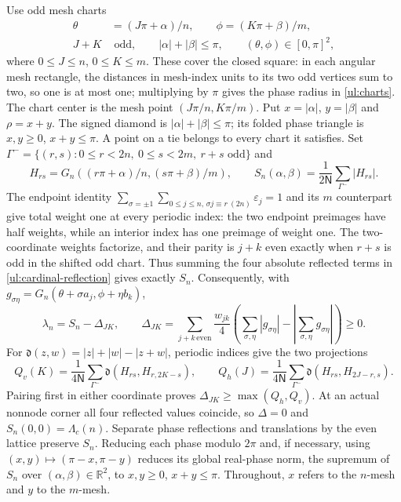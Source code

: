 Use odd mesh charts
\begin{equation}\label{ul:charts}
 \begin{aligned}
 \theta&=(J\pi+\alpha)/n,\qquad \phi=(K\pi+\beta)/m,\\
 J+K&\text{ odd},\qquad |\alpha|+|\beta|\leq\pi,
       \qquad (\theta,\phi)\in[0,\pi]^2,
 \end{aligned}
\end{equation}
where $0\leq J\leq n$, $0\leq K\leq m$.  These cover the closed
square: in each angular mesh rectangle, the distances in mesh-index units to its
two odd vertices sum to two, so one is at most one; multiplying by
$\pi$ gives the phase radius in \eqref{ul:charts}.  The chart center is the mesh point $(J\pi/n,K\pi/m)$. Put
$x=|\alpha|$, $y=|\beta|$ and $\rho=x+y$.
The signed diamond is $|\alpha|+|\beta|\leq\pi$; its folded
phase triangle is $x,y\geq0$, $x+y\leq\pi$.
A point on a tie belongs to every chart it satisfies.
Set $\Gamma^-=\{(r,s):0\leq r<2n,\ 0\leq s<2m,\ r+s\text{ odd}\}$ and
\begin{equation}\label{ul:primitive}
 H_{rs}=G_n((r\pi+\alpha)/n,(s\pi+\beta)/m),\qquad
 S_n(\alpha,\beta)=\frac1{2\mathsf N}\sum_{\Gamma^-}|H_{rs}|.
\end{equation}
The endpoint identity
$\sum_{\sigma=\pm1}\sum_{0\leq j\leq n,\,\sigma j\equiv r\ (2n )}\varepsilon_j=1$
and its $m$ counterpart give total weight one at every periodic
index: the two endpoint preimages have half weights, while an interior
index has one preimage of weight one. The two-coordinate weights
factorize, and their parity is $j+k$ even exactly when $r+s$ is odd
in the shifted odd chart. Thus summing the four absolute reflected
terms in \eqref{ul:cardinal-reflection} gives exactly $S_n$.
Consequently, with $g_{\sigma\eta}=G_n(\theta+\sigma a_j,\phi+\eta b_k)$,
\begin{equation}\label{ul:defect}
 \lambda_n=S_n-\Delta_{JK},\qquad
 \Delta_{JK}=\sum_{j+k\,\mathrm{even}}\frac{w_{jk}}4
 \left(\sum_{\sigma,\eta}|g_{\sigma\eta}|
             -\left|\sum_{\sigma,\eta}g_{\sigma\eta}\right|\right)\geq0.
\end{equation}
For $\mathfrak d(z,w)=|z|+|w|-|z+w|$, periodic indices give the two projections
\begin{equation}\label{ul:projections}
 Q_v(K)=\frac1{4\mathsf N}\sum_{\Gamma^-}\mathfrak d(H_{rs},H_{r,2K-s}),
 \qquad
 Q_h(J)=\frac1{4\mathsf N}\sum_{\Gamma^-}\mathfrak d(H_{rs},H_{2J-r,s}).
\end{equation}
Pairing first in either coordinate proves
$\Delta_{JK}\geq\max(Q_h,Q_v)$.
At an actual nonnode corner all four reflected values coincide, so
$\Delta=0$ and $S_n(0,0)=\Lambda_c(n)$.
Separate phase reflections and translations by the even lattice preserve
$S_n$.  Reducing each phase modulo $2\pi$ and, if necessary, using
$(x,y)\mapsto(\pi-x,\pi-y)$ reduces its global real-phase norm, the supremum of $S_n$ over
$(\alpha,\beta)\in\mathbb R^2$, to
$x,y\geq0$, $x+y\leq\pi$.  Throughout, $x$ refers to the $n$-mesh and $y$ to the $m$-mesh.


